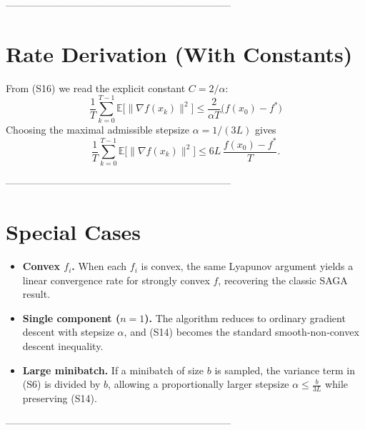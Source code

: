 \documentclass{article}
\newcommand{\E}{\mathbb{E}}
\begin{document}
--------------------------------------------------------------------

\section*{Rate Derivation (With Constants)}
From (S16) we read the explicit constant $C=2/\alpha$:
\[
\boxed{\;
\frac{1}{T}\sum_{k=0}^{T-1}\E\!\bigl[\|\nabla f(x_k)\|^{2}\bigr]
\le \frac{2}{\alpha T}\bigl(f(x_{0})-f^{*}\bigr)
\;}
\]
Choosing the maximal admissible stepsize $\alpha=1/(3L)$ gives
\[
\frac{1}{T}\sum_{k=0}^{T-1}\E\!\bigl[\|\nabla f(x_k)\|^{2}\bigr]
\le 6L\,\frac{f(x_{0})-f^{*}}{T}.
\]

--------------------------------------------------------------------

\section*{Special Cases}
\begin{itemize}
\item \textbf{Convex $f_i$.} When each $f_i$ is convex, the same Lyapunov
argument yields a linear convergence rate for strongly convex $f$,
recovering the classic SAGA result.
\item \textbf{Single component ($n=1$).} The algorithm reduces to ordinary
gradient descent with stepsize $\alpha$, and (S14) becomes the standard
smooth‑non‑convex descent inequality.
\item \textbf{Large minibatch.} If a minibatch of size $b$ is sampled,
the variance term in (S6) is divided by $b$, allowing a proportionally
larger stepsize $\alpha\le \frac{b}{3L}$ while preserving (S14).
\end{itemize}

--------------------------------------------------------------------
\end{document}
